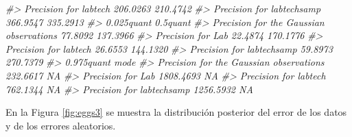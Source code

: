 \documentclass[
]{book}
\newenvironment{Shaded}{\begin{snugshade}}{\end{snugshade}}
\newcommand{\AttributeTok}[1]{\textcolor[rgb]{0.77,0.63,0.00}{#1}}
\newcommand{\CommentTok}[1]{\textcolor[rgb]{0.56,0.35,0.01}{\textit{#1}}}
\newcommand{\ConstantTok}[1]{\textcolor[rgb]{0.00,0.00,0.00}{#1}}
\newcommand{\ControlFlowTok}[1]{\textcolor[rgb]{0.13,0.29,0.53}{\textbf{#1}}}
\newcommand{\DecValTok}[1]{\textcolor[rgb]{0.00,0.00,0.81}{#1}}
\newcommand{\FunctionTok}[1]{\textcolor[rgb]{0.00,0.00,0.00}{#1}}
\newcommand{\NormalTok}[1]{#1}
\newcommand{\OtherTok}[1]{\textcolor[rgb]{0.56,0.35,0.01}{#1}}
\newcommand{\SpecialCharTok}[1]{\textcolor[rgb]{0.00,0.00,0.00}{#1}}
\newcommand{\StringTok}[1]{\textcolor[rgb]{0.31,0.60,0.02}{#1}}
\begin{document}
\begin{Shaded}
\begin{Highlighting}[]
\CommentTok{\#\textgreater{} Precision for labtech                   206.0263 210.4742}
\CommentTok{\#\textgreater{} Precision for labtechsamp               366.9547 335.2913}
\CommentTok{\#\textgreater{}                                         0.025quant 0.5quant}
\CommentTok{\#\textgreater{} Precision for the Gaussian observations    77.8092 137.3966}
\CommentTok{\#\textgreater{} Precision for Lab                          22.4874 170.1776}
\CommentTok{\#\textgreater{} Precision for labtech                      26.6553 144.1320}
\CommentTok{\#\textgreater{} Precision for labtechsamp                  59.8973 270.7379}
\CommentTok{\#\textgreater{}                                         0.975quant mode}
\CommentTok{\#\textgreater{} Precision for the Gaussian observations   232.6617   NA}
\CommentTok{\#\textgreater{} Precision for Lab                        1808.4693   NA}
\CommentTok{\#\textgreater{} Precision for labtech                     762.1344   NA}
\CommentTok{\#\textgreater{} Precision for labtechsamp                1256.5932   NA}
\end{Highlighting}
\end{Shaded}

En la Figura \ref{fig:eggs3} se muestra la distribución posterior del error de los datos y de los errores aleatorios.

\begin{Shaded}
\end{Shaded}
\end{document}
